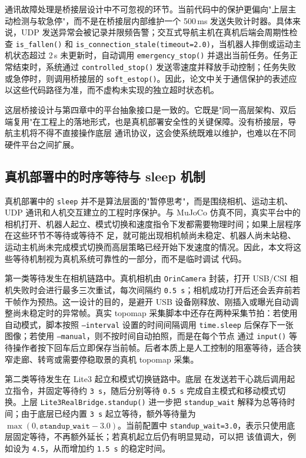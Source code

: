 通讯故障处理是桥接层设计中不可忽视的环节。当前代码中的保护更偏向"上层主动检测与软急停"，而不是在桥接层内部维护一个 500\,ms 发送失败计时器。具体来说，UDP 发送异常会被记录并限频告警；交互式导航主机在真机后端会周期性检查 \texttt{is\_fallen()} 和 \texttt{is\_connection\_stale(timeout=2.0)}，当机器人摔倒或运动主机状态超过 2\,s 未更新时，自动调用 \texttt{emergency\_stop()} 并退出当前任务。任务正常结束时，系统通过 \texttt{controlled\_stop()} 发送零速度并释放手动控制；任务失败或急停时，则调用桥接层的 \texttt{soft\_estop()}。因此，论文中关于通信保护的表述应以这些代码路径为准，而不虚构未实现的独立超时状态机。

这层桥接设计与第四章中的平台抽象接口是一致的。它既是"同一高层架构、双后端复用"在工程上的落地形式，也是真机部署安全性的关键保障。没有桥接层，导航主机将不得不直接操作底层
通讯协议，这会使系统既难以维护，也难以在不同硬件平台之间扩展。

\subsection{真机部署中的时序等待与 sleep 机制}

真机部署中的 \texttt{sleep} 并不是算法层面的"暂停思考"，而是围绕相机、运动主机、UDP
通讯和人机交互建立的工程时序保护。与 MuJoCo 仿真不同，真实平台中的相机打开、机器人起立、模式切换和速度指令下发都需要物理时间；如果上层程序在这些环节不等待或等待不
足，就可能出现相机帧尚未稳定、机器人尚未站稳、运动主机尚未完成模式切换而高层策略已经开始下发速度的情况。因此，本文将这些等待机制视为真机系统可靠性的一部分，而不是临时调试
代码。

第一类等待发生在相机链路中。真机相机由 \texttt{OrinCamera} 封装，打开 USB/CSI 相机失败时会进行最多三次重试，每次间隔约
\texttt{0.5\,s}；相机成功打开后还会丢弃前若干帧作为预热。这一设计的目的，是避开 USB
设备刚释放、刚插入或曝光自动调整尚未稳定时的异常帧。真实 topomap 采集脚本中还存在两种采集节拍：若使用自动模式，脚本按照
\texttt{--interval} 设置的时间间隔调用 \texttt{time.sleep} 后保存下一张图像；若使用 \texttt{--manual}，则不按时间自动拍照，而是在每个节点
通过 \texttt{input()} 等待操作者按下回车后立即保存当前帧。后者本质上是人工控制的阻塞等待，适合狭窄走廊、转弯或需要停稳取景的真机 topomap 采集。

第二类等待发生在 Lite3 起立和模式切换链路中。底层  在发送若干心跳后调用起立指令，并固定等待约
\texttt{3\,s}，随后分别等待 \texttt{0.5\,s} 完成自主模式和移动模式切换。上层 \texttt{Lite3RealBridge.standup()} 进一步把
\texttt{standup\_wait} 解释为总等待时间；由于底层已经内置 \texttt{3\,s} 起立等待，额外等待量为
\(\max(0,\texttt{standup\_wait}-3.0)\)。当前配置中 \texttt{standup\_wait=3.0}，表示只使用底层固定等待，不再额外延长；若真机起立后仍有明显晃动，可以把
该值调大，例如设为 \texttt{4.5}，从而增加约 \texttt{1.5\,s} 的稳定时间。

